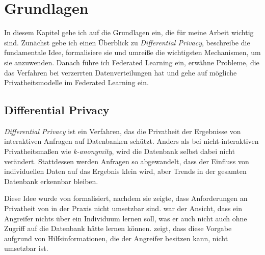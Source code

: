 \chapter{Grundlagen}\label{chap:fundamentals}


In diesem Kapitel gehe ich auf die Grundlagen ein, die für meine Arbeit wichtig sind. Zunächst gebe ich einen Überblick zu \textit{Differential Privacy}, beschreibe die fundamentale Idee, formalisiere sie und umreiße die wichtigsten Mechanismen, um sie anzuwenden. Danach führe ich Federated Learning ein, erwähne Probleme, die das Verfahren bei verzerrten Datenverteilungen hat und gehe auf mögliche Privatheitsmodelle im Federated Learning ein.

\section{Differential Privacy}


\textit{Differential Privacy} ist ein Verfahren, das die Privatheit der Ergebnisse von interaktiven Anfragen auf Datenbanken schützt. Anders als bei nicht-interaktiven Privatheitsmaßen wie \textit{k-anonymity}, wird die Datenbank selbst dabei nicht verändert. Stattdessen werden Anfragen so abgewandelt, dass der Einfluss von individuellen Daten auf das Ergebnis klein wird, aber Trends in der gesamten Datenbank erkennbar bleiben.

Diese Idee wurde von \textcite{dwork:2006} formalisiert, nachdem sie zeigte, dass Anforderungen an Privatheit von \textcite{dalenius:1977} in der Praxis nicht umsetzbar sind. \citeauthor{dalenius:1977} war der Ansicht, dass ein Angreifer nichts über ein Individuum lernen soll, was er auch nicht auch ohne Zugriff auf die Datenbank hätte lernen können. \citeauthor{dwork:2006} zeigt, dass diese Vorgabe aufgrund von Hilfsinformationen, die der Angreifer besitzen kann, nicht umsetzbar ist. 


